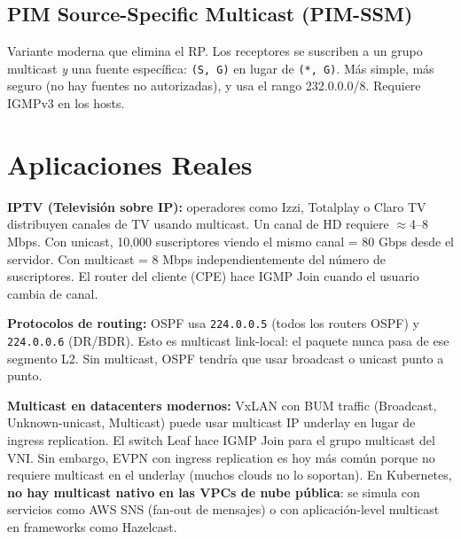 \subsection{PIM Source-Specific Multicast (PIM-SSM)}

\begin{concepto}
Variante moderna que elimina el RP. Los receptores se suscriben a un grupo multicast
\emph{y} una fuente específica: \texttt{(S, G)} en lugar de \texttt{(*, G)}. Más simple,
más seguro (no hay fuentes no autorizadas), y usa el rango 232.0.0.0/8.
Requiere IGMPv3 en los hosts.
\end{concepto}

\section{ Aplicaciones Reales}

\begin{ejemplo}
\textbf{IPTV (Televisión sobre IP):} operadores como Izzi, Totalplay o Claro TV
distribuyen canales de TV usando multicast. Un canal de HD requiere $\approx$4--8 Mbps.
Con unicast, 10,000 suscriptores viendo el mismo canal = 80 Gbps desde el servidor.
Con multicast = 8 Mbps independientemente del número de suscriptores. El router del
cliente (CPE) hace IGMP Join cuando el usuario cambia de canal.
\end{ejemplo}

\begin{ejemplo}
\textbf{Protocolos de routing:} OSPF usa \texttt{224.0.0.5} (todos los routers OSPF)
y \texttt{224.0.0.6} (DR/BDR). Esto es multicast link-local: el paquete nunca pasa
de ese segmento L2. Sin multicast, OSPF tendría que usar broadcast o unicast punto a punto.
\end{ejemplo}

\begin{moderno}
 \textbf{Multicast en datacenters modernos:} VxLAN con BUM traffic
(Broadcast, Unknown-unicast, Multicast) puede usar multicast IP underlay en lugar
de ingress replication. El switch Leaf hace IGMP Join para el grupo multicast del VNI.
Sin embargo, EVPN con ingress replication es hoy más común porque no requiere multicast
en el underlay (muchos clouds no lo soportan). En Kubernetes, \textbf{no hay multicast
nativo en las VPCs de nube pública}: se simula con servicios como AWS SNS (fan-out de
mensajes) o con aplicación-level multicast en frameworks como Hazelcast.
\end{moderno}

